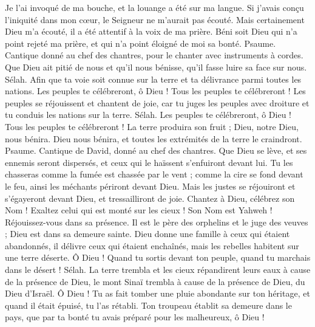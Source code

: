 \begin{multicols}{2}
Je l'ai invoqué de ma bouche, et la louange a été sur ma langue.
Si j'avais conçu l'iniquité dans mon cœur, le Seigneur ne m'aurait pas écouté.
Mais certainement Dieu m'a écouté, il a été attentif à la voix de ma prière.
Béni soit Dieu qui n'a point rejeté ma prière, et qui n'a point éloigné de moi sa bonté.
\VerseOne{}Psaume. Cantique donné au chef des chantres, pour le chanter avec instruments à cordes.
Que Dieu ait pitié de nous et qu'il nous bénisse, qu'il fasse luire sa face sur nous. Sélah.
Afin que ta voie soit connue sur la terre et ta délivrance parmi toutes les nations.
Les peuples te célébreront, ô Dieu ! Tous les peuples te célébreront !
Les peuples se réjouissent et chantent de joie, car tu juges les peuples avec droiture et tu conduis les nations sur la terre. Sélah.
Les peuples te célébreront, ô Dieu ! Tous les peuples te célébreront !
La terre produira son fruit ; Dieu, notre Dieu, nous bénira.
Dieu nous bénira, et toutes les extrémités de la terre le craindront.
\VerseOne{}Psaume. Cantique de David, donné au chef des chantres.
Que Dieu se lève, et ses ennemis seront dispersés, et ceux qui le haïssent s'enfuiront devant lui.
Tu les chasseras comme la fumée est chassée par le vent ; comme la cire se fond devant le feu, ainsi les méchants périront devant Dieu.
Mais les justes se réjouiront et s'égayeront devant Dieu, et tressailliront de joie.
Chantez à Dieu, célébrez son Nom ! Exaltez celui qui est monté sur les cieux ! Son Nom est Yahweh ! Réjouissez-vous dans sa présence.
Il est le père des orphelins et le juge des veuves ; Dieu est dans sa demeure sainte.
Dieu donne une famille à ceux qui étaient abandonnés, il délivre ceux qui étaient enchaînés, mais les rebelles habitent sur une terre déserte.
Ô Dieu ! Quand tu sortis devant ton peuple, quand tu marchais dans le désert ! Sélah.
La terre trembla et les cieux répandirent leurs eaux à cause de la présence de Dieu, le mont Sinaï trembla à cause de la présence de Dieu, du Dieu d'Israël.
Ô Dieu ! Tu as fait tomber une pluie abondante sur ton héritage, et quand il était épuisé, tu l'as rétabli.
Ton troupeau établit sa demeure dans le pays, que par ta bonté tu avais préparé pour les malheureux, ô Dieu !

\end{multicols}
